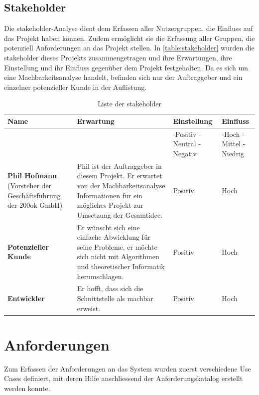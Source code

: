 \subsection{Stakeholder}\label{stakeholder}
Die \gls{stakeholder}-Analyse dient dem Erfassen aller Nutzergruppen, die Einfluss auf das Projekt haben können. Zudem ermöglicht sie die Erfassung aller Gruppen, die potenziell 
Anforderungen an das Projekt stellen. In \autoref{table:stakeholder} wurden die \gls{stakeholder} dieses Projekts zusammengetragen und ihre Erwartungen, ihre 
Einstellung und ihr Einfluss gegenüber dem Projekt festgehalten. Da es sich um eine Machbarkeitsanalyse handelt, befinden sich nur der Auftraggeber und ein einzelner potenzieller Kunde in der 
Auflistung.

\begin{table}[ht]
\centering
  \begin{tabular}{ p{5cm} | p{5cm} | p{1.5cm} | p{1.5cm} }
	\hline
	\rowcolor{darkgray}
	\textbf{Name}					&	\textbf{Erwartung}	&	\textbf{Einstellung} 	&	\textbf{Einfluss}	\\ \hline
	\rowcolor{gray}
								&				&	-Positiv \mbox{-Neutral} \mbox{-Negativ} 	&	-Hoch \mbox{-Mittel} \mbox{-Niedrig} \\ \hline
	\textbf{Phil Hofmann} (Vorsteher der Geschäftsführung der 200ok GmbH)						
								&	Phil ist der Auftraggeber in diesem Projekt. Er erwartet von der Machbarkeitsanalyse Informationen für ein mögliches Projekt zur 
									Umsetzung der Gesamtidee.
												& 	Positiv		&	Hoch		\\ \hline
	\textbf{Potenzieller Kunde}
								&	Er wünscht sich eine einfache Abwicklung für seine Probleme, er möchte sich nicht mit Algorithmen und 
									theoretischer Informatik herumschlagen.
												& 	Positiv		&	Hoch		\\ \hline
	\textbf{Entwickler}
								&	Er hofft, dass sich die Schnittstelle als machbar erweist.
												& 	Positiv		&	Hoch		\\ \hline												
  \end{tabular}
   \caption{Liste der \gls{stakeholder}}\label{table:stakeholder}
\end{table}

\newpage
\section{Anforderungen}\label{sec.anfoderungen}
Zum Erfassen der Anforderungen an das System wurden zuerst verschiedene Use Cases definiert, mit deren Hilfe anschliessend der Anforderungskatalog erstellt werden konnte.


